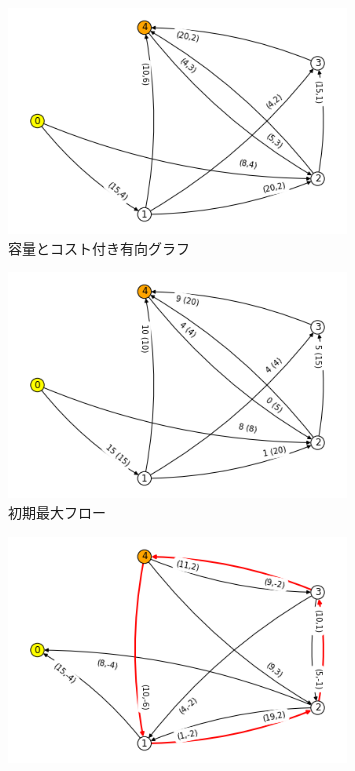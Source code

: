 \documentclass{report}
\begin{document}
\begin{CJK}{UTF8}{min}
    \begin{figure}[!h]
        \centerline{\includegraphics[width=0.8\textwidth]{data/ex12-MF-start.png}}
        \caption{容量とコスト付き有向グラフ}
    \end{figure}
    \begin{figure}[!h]
        \centerline{\includegraphics[width=0.8\textwidth]{data/ex12-MF-flow-start.png}}
        \caption{初期最大フロー}
    \end{figure}
    \begin{figure}[!h]
        \centerline{\includegraphics[width=0.8\textwidth]{data/ex12-MF-1.png}}

\end{figure}
\end{CJK}
\end{document}
